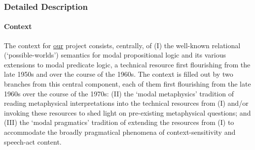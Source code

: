 \documentclass[12pt]{article}
\begin{document}




\subsubsection*{Detailed Description}

\paragraph{Context} The context for \ul{our} project consists, centrally, of (I) the
well-known relational (`possible-worlds') semantics for modal propositional
logic and its various extensions to modal predicate logic, a technical
resource first flourishing from the late 1950s and over the course of the
1960s. The context is filled out by two branches from this central component,
each of them first flourishing from the late 1960s over the course of the
1970s: (II) the `modal metaphysics' tradition of reading metaphysical
interpretations into the technical resources from (I) and/or invoking these
resources to shed light on pre-existing metaphysical questions; and (III) the
`modal pragmatics' tradition of extending the resources from (I) to
accommodate the broadly pragmatical phenomena of context-sensitivity and
speech-act content.

\smallskip{}
\end{document}
